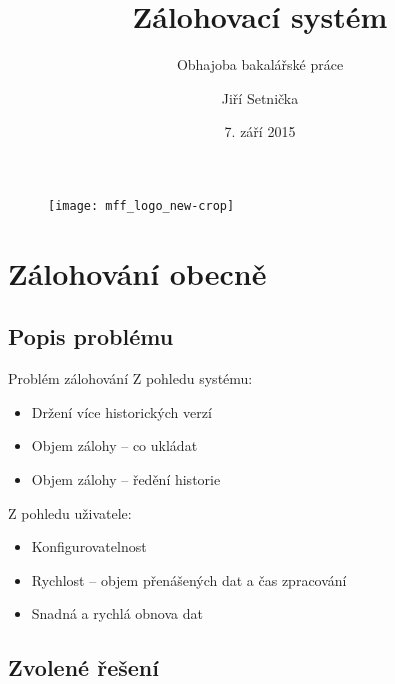 \documentclass{beamer}				%
\title[Zálohovací systém]{Zálohovací systém}
\subtitle{Obhajoba bakalářské práce}
\author{Jiří Setnička}
\institute[KAM]{Katedra aplikované matematiky}
\date{7. září 2015}
\begin{document}
\def\O{{\cal O}}

\begin{frame}[plain]
\vfill
\begin{figure}
	\texttt{[image: mff\_logo\_new-crop]}
\end{figure}
\titlepage
\end{frame}

\section{Zálohování obecně}
\subsection{Popis problému}

\begin{frame}{Problém zálohování}
Z pohledu systému:\pause
\begin{itemize}
	\item Držení více historických verzí
	\pause\item Objem zálohy -- co ukládat
	\pause\item Objem zálohy -- ředění historie
\end{itemize}

\bigskip
Z pohledu uživatele:\pause
\begin{itemize}
	\item Konfigurovatelnost
	\pause\item Rychlost -- objem přenášených dat a čas zpracování
	\pause\item Snadná a rychlá obnova dat
\end{itemize}
\end{frame}

\subsection{Zvolené řešení}
\end{document}
